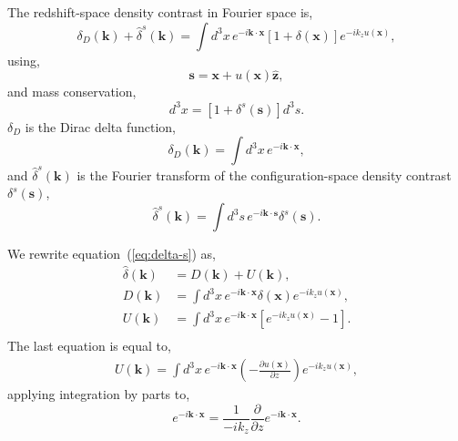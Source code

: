 \documentclass[a4paper,11pt, fleqn]{article}
\begin{document}
The redshift-space density contrast in Fourier space is,
%
\begin{equation}
  \delta_D(\bm{k}) + \hat{\delta}^s(\bm{k}) = \int \! d^3 x \, e^{-i\bm{k}\cdot\bm{x}} [1 + \delta(\bm{x})] e^{-ik_z u(\bm{x})},
\end{equation}
%
using,
%
\begin{equation}
  \bm{s} = \bm{x} + u(\bm{x}) \hat{\bm{z}},
\end{equation}
%
and mass conservation,
%
\begin{equation}
  [1 + \delta(\bm{x})] d^3 x = [1 + \delta^s(\bm{s})] d^3 s.
\end{equation}
%
$\delta_D$ is the Dirac delta function,
%
\begin{equation}
  \delta_D(\bm{k}) = \int\! d^3 x \, e^{-i\bm{k}\cdot\bm{x}},
\end{equation}
and $\hat{\delta}^s(\bm{k})$ is the Fourier transform of the
configuration-space density contrast $\delta^s(\bm{s})$,
%
\begin{equation}
  \hat{\delta}^s(\bm{k}) = \int \! d^3 s \,
                           e^{-i\bm{k}\cdot\bm{s}} \delta^s(\bm{s}).
\end{equation}

\vspace{10mm}
We rewrite equation~(\ref{eq:delta-s}) as,
%
\begin{align}
  \hat{\delta}(\bm{k}) &= D(\bm{k}) + U(\bm{k}),\\
  D(\bm{k}) &= \int \! d^3 x \, e^{-i\bm{k}\cdot\bm{x}} \delta(\bm{x})
                                e^{-ik_z u(\bm{x})},\\
  \label{eq:U}
  U(\bm{k}) &= \int \! d^3 x \, e^{-i\bm{k}\cdot\bm{x}}
                              \left[ e^{-ik_z u(\bm{x})} - 1 \right].\\
\end{align}
%
The last equation is equal to,
%
\begin{equation}\begin{split}
  \label{eq:Uprime}
  U(\bm{k}) = \int\! d^3 x \, e^{-i \bm{k}\cdot\bm{x}}
              \left( - \frac{\partial u(\bm{x})}{\partial z} \right)
              e^{-ik_z u(\bm{x})},
\end{split}\end{equation}
applying integration by parts to,
\begin{equation}
  e^{-i \bm{k}\cdot\bm{x}} = \frac{1}{-ik_z}
  \frac{\partial}{\partial z} e^{-i \bm{k}\cdot\bm{x}}.
\end{equation}
\end{document}

